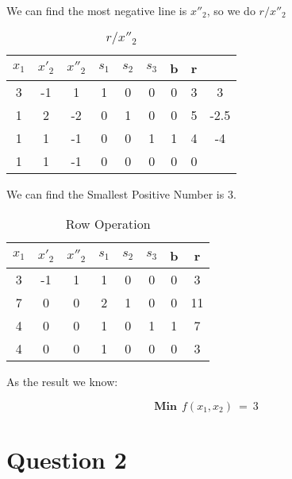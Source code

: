 \documentclass{article}
\begin{document}
  We can find the most negative line is $x''_2$, so we do $r/x''_2$

  \begin{table}[H]
  \centering
  \caption{$r/x''_2$}
  \begin{tabular}{|c|c|c|c|c|c|c|c|c|}
  \hline
  $x_1$ & $x'_2$ & $x''_2$  & $s_1$ & $s_2$ & $s_3$ & b & r &      \\ \hline
  3    & -1    & 1       & 1    & 0    & 0    & 0 & 3 & \cellcolor{yellow}3    \\ \hline
  1    & 2     & -2      & 0    & 1    & 0    & 0 & 5 & -2.5 \\ \hline
  1    & 1     & -1      & 0    & 0    & 1    & 1 & 4 & -4   \\ \hline
  1    & 1     & \cellcolor{green}-1      & 0    & 0    & 0    & 0 & 0 &      \\ \hline
  \end{tabular}
  \end{table}

  We can find the Smallest Positive Number is $3$.

  \begin{table}[H]
  \centering
  \caption{Row Operation}
  \begin{tabular}{|c|c|c|c|c|c|c|c|}
  \hline
  $x_1$ & $x'_2$ & $x''_2$  & $s_1$ & $s_2$ & $s_3$ & b & r \\ \hline
  3    & -1    & 1       & 1    & 0    & 0    & 0 & 3  \\ \hline
  7    & 0     & 0       & 2    & 1    & 0    & 0 & 11 \\ \hline
  4    & 0     & 0       & 1    & 0    & 1    & 1 & 7  \\ \hline
  4    & 0     & 0       & 1    & 0    & 0    & 0 & 3  \\ \hline
  \end{tabular}
  \end{table}

  As the result we know:

  $$ \textbf{Min}\:\: f(x_1,x_2) \: =\: 3 $$


  \section{Question 2}
\end{document}
